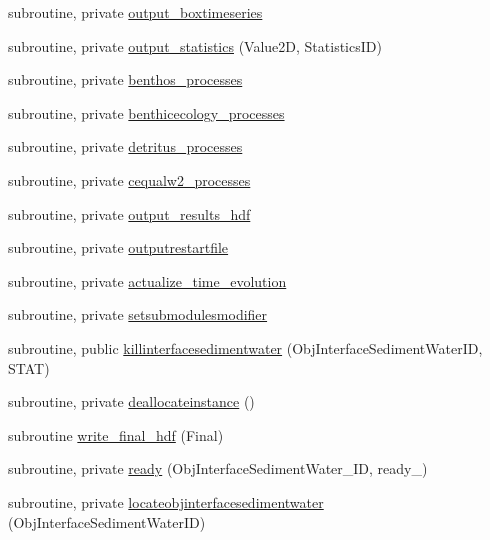 \begin{DoxyCompactItemize}
\item 
subroutine, private \mbox{\hyperlink{namespacemoduleinterfacesedimentwater_ae4c4f73744fd3c2e241e675f6fc1d839}{output\+\_\+boxtimeseries}}
\item 
subroutine, private \mbox{\hyperlink{namespacemoduleinterfacesedimentwater_aa57d7b6cd225347d61e24202cb55d26b}{output\+\_\+statistics}} (Value2D, Statistics\+ID)
\item 
subroutine, private \mbox{\hyperlink{namespacemoduleinterfacesedimentwater_a6fc6699ed26c842c7951c9c436867a65}{benthos\+\_\+processes}}
\item 
subroutine, private \mbox{\hyperlink{namespacemoduleinterfacesedimentwater_a474f4e07894c361e5aaa94f48648a6b1}{benthicecology\+\_\+processes}}
\item 
subroutine, private \mbox{\hyperlink{namespacemoduleinterfacesedimentwater_a2327d7638eb1058aa8b3f9f188eda1c9}{detritus\+\_\+processes}}
\item 
subroutine, private \mbox{\hyperlink{namespacemoduleinterfacesedimentwater_aa03ae3c533041dd1f82ad0796e923671}{cequalw2\+\_\+processes}}
\item 
subroutine, private \mbox{\hyperlink{namespacemoduleinterfacesedimentwater_ab623073c171ba3d532b1c1ec393f91b6}{output\+\_\+results\+\_\+hdf}}
\item 
subroutine, private \mbox{\hyperlink{namespacemoduleinterfacesedimentwater_a25afe0c9ade674061e39cc5e6456dd28}{outputrestartfile}}
\item 
subroutine, private \mbox{\hyperlink{namespacemoduleinterfacesedimentwater_a82f97321667d905db79c85b574f47802}{actualize\+\_\+time\+\_\+evolution}}
\item 
subroutine, private \mbox{\hyperlink{namespacemoduleinterfacesedimentwater_ae902470f5fe9f7c4442249a86b00147e}{setsubmodulesmodifier}}
\item 
subroutine, public \mbox{\hyperlink{namespacemoduleinterfacesedimentwater_a692292c5eb96b9de096ef130fafc0962}{killinterfacesedimentwater}} (Obj\+Interface\+Sediment\+Water\+ID, S\+T\+AT)
\item 
subroutine, private \mbox{\hyperlink{namespacemoduleinterfacesedimentwater_a0dea9565c188c72edf29abf28839a5ac}{deallocateinstance}} ()
\item 
subroutine \mbox{\hyperlink{namespacemoduleinterfacesedimentwater_a44d390c3a6dfc918b1ff6bc5261c39ec}{write\+\_\+final\+\_\+hdf}} (Final)
\item 
subroutine, private \mbox{\hyperlink{namespacemoduleinterfacesedimentwater_af31617d2ab88d4aceb9dd0edcac94ff2}{ready}} (Obj\+Interface\+Sediment\+Water\+\_\+\+ID, ready\+\_\+)
\item 
subroutine, private \mbox{\hyperlink{namespacemoduleinterfacesedimentwater_a299f7798fddc9b92224d7bf9ec6785c0}{locateobjinterfacesedimentwater}} (Obj\+Interface\+Sediment\+Water\+ID)
\end{DoxyCompactItemize}
